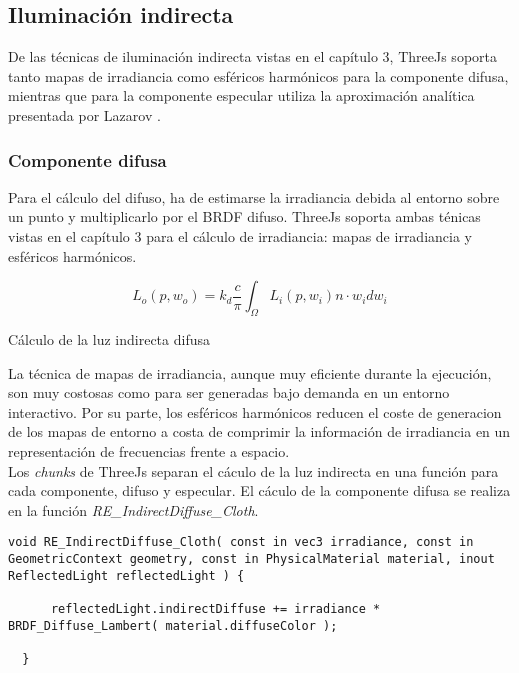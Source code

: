   \subsection{Iluminaci\'on indirecta}
    De las t\'ecnicas de iluminaci\'on indirecta vistas en el cap\'itulo 3, ThreeJs soporta tanto mapas de
    irradiancia como esf\'ericos harm\'onicos para la componente difusa, mientras que para la componente
    especular utiliza la aproximaci\'on anal\'itica presentada por Lazarov \autocite{blackops}.

    \subsubsection{Componente difusa}
      Para el c\'alculo del difuso, ha de estimarse la irradiancia debida al entorno sobre un punto y multiplicarlo
      por el BRDF difuso. ThreeJs soporta ambas t\'enicas vistas en el cap\'itulo 3 para el c\'alculo de irradiancia:
      mapas de irradiancia y esf\'ericos harm\'onicos.

      \begin{eqfloat}[!htb]
        \begin{equation}
          L_o(p, w_o) = k_d \frac{c}{\pi} \int_{\Omega}{L_i(p, w_i) n\cdot{w_i}dw_i}
        \end{equation}
      \caption{C\'alculo de la luz indirecta difusa}
      \end{eqfloat}

      La t\'ecnica de mapas de irradiancia, aunque muy eficiente durante la ejecuci\'on, son muy costosas como para
      ser generadas bajo demanda en un entorno interactivo. Por su parte, los esf\'ericos harm\'onicos reducen el coste
      de generacion de los mapas de entorno a costa de comprimir la informaci\'on de irradiancia en un representaci\'on
      de frecuencias frente a espacio.\\

      Los \textit{chunks} de ThreeJs separan el c\'aculo de la luz indirecta en una funci\'on para cada componente, difuso
      y especular. El c\'aculo de la componente difusa se realiza en la funci\'on \textit{RE\_IndirectDiffuse\_Cloth}.\\

      \begin{lstlisting}[caption=C\'alculo de la ecuaci\'on de render para la componente difusa de \textit{MeshClothMaterial}]
  void RE_IndirectDiffuse_Cloth( const in vec3 irradiance, const in GeometricContext geometry, const in PhysicalMaterial material, inout ReflectedLight reflectedLight ) {
  
      reflectedLight.indirectDiffuse += irradiance * BRDF_Diffuse_Lambert( material.diffuseColor );
  
  }
      \end{lstlisting}

